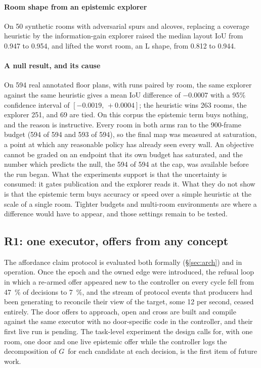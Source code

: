 \documentclass[10pt,twocolumn]{IEEEtran}
\newcommand{\efe}{\ensuremath{G}}
\begin{document}
\paragraph{Room shape from an epistemic explorer} On \num{50} synthetic rooms with adversarial spurs
and alcoves, replacing a coverage heuristic by the information-gain explorer raised the median layout
IoU from \num{0.947} to \num{0.954}, and lifted the worst room, an L shape, from \num{0.812} to
\num{0.944}.

\paragraph{A null result, and its cause} On \num{594} real annotated floor plans, with runs paired
by room, the same explorer against the same heuristic gives a mean IoU difference of $-0.0007$ with a
95\% confidence interval of $[-0.0019,\,+0.0004]$; the heuristic wins 263 rooms, the explorer 251, and
69 are tied. On this corpus the epistemic term buys nothing, and the reason is instructive. Every room
in both arms ran to the 900-frame budget (594 of 594 and 593 of 594), so the final map was measured at
saturation, a point at which any reasonable policy has already seen every wall. An objective cannot
be graded on an endpoint that its own budget has saturated, and the number which predicts the null,
the 594 of 594 at the cap, was available before the run began. What the experiments support is that
the uncertainty is consumed: it gates publication and the explorer reads it. What they do not show is
that the epistemic term buys accuracy or speed over a simple heuristic at the scale of a single room.
Tighter budgets and multi-room environments are where a difference would have to appear, and those
settings remain to be tested.

\subsection{R1: one executor, offers from any concept}\label{sec:eval:r1}

The affordance claim protocol is evaluated both formally (\S\ref{sec:arch}) and in operation. Once the
epoch and the owned edge were introduced, the refusal loop in which a re-armed offer appeared new to
the controller on every cycle fell from \SI{47}{\percent} of decisions to \SI{7}{\percent}, and the
stream of protocol events that producers had been generating to reconcile their view of the target,
some \num{12} per second, ceased entirely. The door offers to approach, open and cross are built and
compile against the same executor with no door-specific code in the controller, and their first live
run is pending. The task-level experiment the design calls for, with one room, one door and one live
epistemic offer while the controller logs the decomposition of \efe\ for each candidate at each
decision, is the first item of future work.
\end{document}
